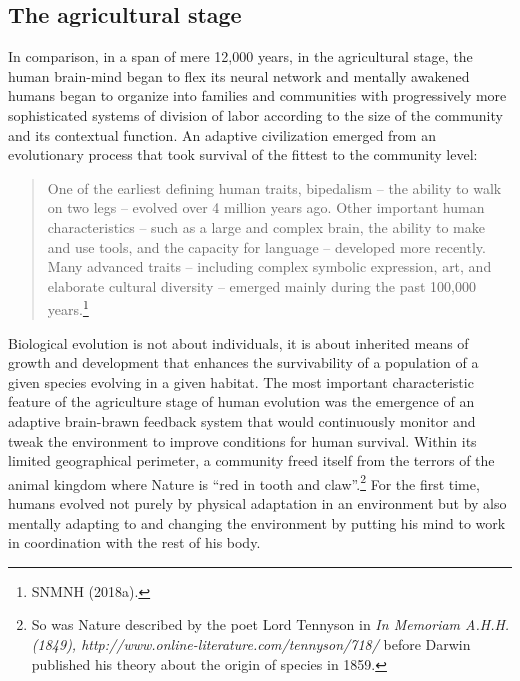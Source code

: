 \begin{multicols}{2}
\subsection*{The agricultural stage}

In comparison, in a span of mere 12,000 years, in the agricultural stage, the human brain-mind began to flex its neural network and mentally awakened humans began to organize into families and communities with progressively more sophisticated systems of division of labor according to the size of the community and its contextual function. An adaptive civilization emerged from an evolutionary process that took survival of the fittest to the community level:
\begin{quote}
One of the earliest defining human traits, bipedalism – the ability to walk on two legs – evolved over 4 million years ago. Other important human characteristics – such as a large and complex brain, the ability to make and use tools, and the capacity for language – developed more recently. Many advanced traits – including complex symbolic expression, art, and elaborate cultural diversity – emerged mainly during the past 100,000 years.\footnote{SNMNH (2018a).}
\end{quote}

Biological evolution is not about individuals, it is about inherited means of growth and development that enhances the survivability of a population of a given species evolving in a given habitat. The most important characteristic feature of the agriculture stage of human evolution was the emergence of an adaptive brain-brawn feedback system that would continuously monitor and tweak the environment to improve conditions for human survival. Within its limited geographical perimeter, a community freed itself from the terrors of the animal kingdom where Nature is “red in tooth and claw”.\footnote{So was Nature described by the poet Lord Tennyson in \textit{In Memoriam A.H.H. (1849), http://www.online-literature.com/tennyson/718/} before Darwin published his theory about the origin of species in 1859.} For the first time, humans evolved not purely by physical adaptation in an environment but by also mentally adapting to and changing the environment by putting his mind to work in coordination with the rest of his body.


\end{multicols}

